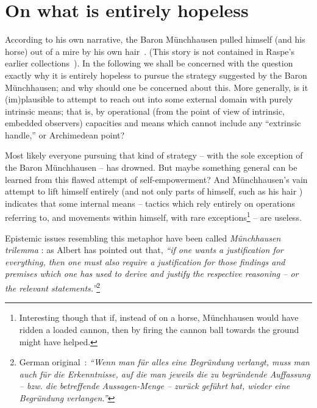 %
%
%

\chapter{On what is entirely hopeless}
\label{2016-pu-book-chapter-pu} %

According to his own narrative, the
Baron M\"unchhausen pulled himself (and his horse) out of a mire by his own hair~\cite[Chapter~4]{Buerger-Muenchhausen}. (This story is not contained in
Raspe's earlier collections~\cite{raspe-1877}).
In the following we shall be concerned with the question exactly why it is entirely hopeless to pursue the strategy
suggested by the Baron M\"unchhausen; and why should one be concerned about this.
More generally, is it (im)plausible to attempt to reach out into some external domain with purely intrinsic means;
that is, by operational (from the point of view of intrinsic, embedded observers) capacities
and means which cannot include any ``extrinsic handle,'' or Archimedean point?

Most likely everyone pursuing that kind of strategy -- with the sole exception of the Baron M\"unchhausen  -- has drowned.
But maybe something general can be learned from this flawed attempt of self-empowerment?
And M\"unchhausen's vain attempt to lift himself entirely (and not only parts of himself, such as his hair
)
indicates that some internal means -- tactics which rely entirely on operations referring to, and movements within himself,
with rare exceptions\footnote{
Interesting though that if, instead of on a horse, M\"unchhausen would have ridden a loaded cannon, then by firing the cannon ball towards the ground might have helped.
} --
are useless.

Epistemic issues resembling this metaphor have been called
{\em M\"unchhausen trilemma}
:
as Albert has pointed out that, {\em ``if one wants a justification for {\em everything}, then one must also require a justification
for those findings and premises which one has used to derive and justify the
respective reasoning -- or the relevant statements.''}\footnote{
German original~\cite[Chapter~2, p.~15]{albert-traktat-68}: {\em ``Wenn man f\"ur {\em alles} eine Begr\"undung verlangt, muss man auch
f\"ur die Erkenntnisse, auf die man jeweils die zu begr\"undende Auffassung -- bzw. die betreffende Aussagen-Menge --
zur\"uck gef\"uhrt hat, wieder eine Begr\"undung verlangen.''}}

